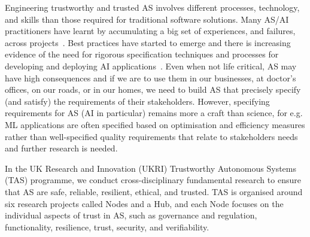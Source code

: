 \documentclass[sigconf,nonacm]{acmart}%
\begin{document}
Engineering trustworthy and trusted AS involves different processes, technology, and skills than those required for traditional software solutions. Many AS/AI practitioners have learnt by accumulating a big set of experiences, and failures, across projects~\cite{AmershiBBDGKNN019}. Best practices have started to emerge and there is increasing evidence of the need for rigorous specification techniques and processes for developing and deploying AI applications~\cite{damour2020}. Even when not life critical, AS may have high consequences and if we are to use them in our businesses, at doctor’s offices, on our roads, or in our homes, we need to build AS that precisely specify (and satisfy) the requirements of their stakeholders. However, specifying requirements for AS (AI in particular) remains more a craft than science, for e.g. ML applications are often specified based on optimisation and efficiency measures rather than well-specified quality requirements that relate to stakeholders needs~\cite{IshikawaM20} and further research is needed.		

%

	In the UK Research and Innovation (UKRI) Trustworthy Autonomous Systems (TAS) programme, we conduct cross-disciplinary fundamental research to ensure that AS are safe, reliable, resilient, ethical, and trusted. TAS is organised around six research projects called Nodes and a Hub, and each Node focuses on the individual aspects of trust in AS, such as governance and regulation, functionality, resilience, trust, security, and verifiability. 
	
\end{document}

